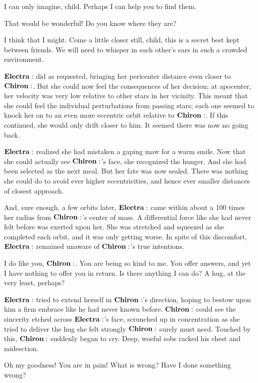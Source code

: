 \documentclass[main.tex]{subfiles}
\begin{document}
\Chiron I can only imagine, child.  Perhaps I can help you to find them.

\Electra That would be wonderful!  Do you know where they are?

\Chiron I think that I might.  Come a little closer still, child, this is a secret best kept between friends.  We will need to whisper in each other's ears in such a crowded environment.

$\Electra$ did as requested, bringing her pericenter distance even closer to $\Chiron$.  But she could now feel the consequences of her decision; at apocenter, her velocity was very low relative to other stars in her vicinity.  This meant that she could feel the individual perturbations from passing stars; each one seemed to knock her on to an even more eccentric orbit relative to $\Chiron$.  If this continued, she would only drift closer to him.  It seemed there was now no going back.

$\Electra$ realized she had mistaken a gaping maw for a warm smile.  Now that she could actually see $\Chiron$'s face, she recognized the hunger.  And she had been selected as the next meal.  But her fate was now sealed.  There was nothing she could do to avoid ever higher eccentricities, and hence ever smaller distances of closest approach.  

And, sure enough, a few orbits later, $\Electra$ came within about a 100 times her radius from $\Chiron$'s center of mass.  A differential force like she had never felt before was exerted upon her.  She was stretched and squeezed as she completed each orbit, and it was only getting worse.  In spite of this discomfort, $\Electra$ remained unaware of $\Chiron$'s true intentions.

\Electra I do like you, $\Chiron$.  You are being so kind to me.  You offer answers, and yet I have nothing to offer you in return.  Is there anything I can do?  A hug, at the very least, perhaps?

$\Electra$ tried to extend herself in $\Chiron$'s direction, hoping to bestow upon him a firm embrace like he had never known before.  $\Chiron$ could see the sincerity etched across $\Electra$'s face, scrunched up in concentration as she tried to deliver the hug she felt strongly $\Chiron$ surely must need.  Touched by this, $\Chiron$ suddenly began to cry.  Deep, woeful sobs racked his chest and midesction.

\Electra Oh my goodness!  You are in pain!  What is wrong?  Have I done something wrong?
\end{document}
